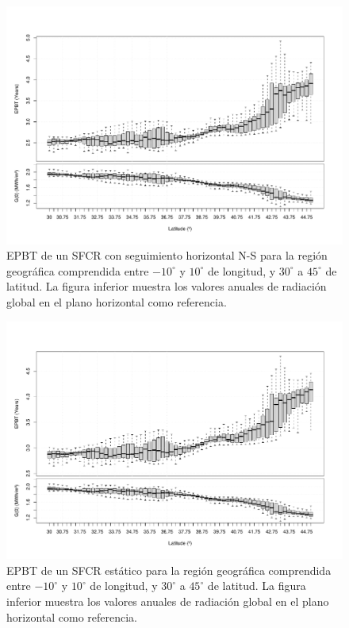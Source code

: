\begin{figure}[p]
\begin{centering}
\includegraphics[height=0.38\textheight]{../figs/BoxPlotEPBTEuropa_SODA002}
\par\end{centering}

\caption{\label{EPBTHorizBoxPlot}EPBT de un SFCR con seguimiento
  horizontal N-S para la región geográfica comprendida entre
  $-10^{\circ}$ y $10^{\circ}$ de longitud, y $30^{\circ}$ a
  $45^{\circ}$ de latitud.  La figura inferior muestra los valores
  anuales de radiación global en el plano horizontal como referencia.}
\end{figure}


\begin{figure}[p]
\begin{centering}
\includegraphics[height=0.38\textheight]{../figs/BoxPlotEPBTEuropa_SODA003}
\par\end{centering}

\caption{\label{EPBTEstBoxPlot}EPBT de un SFCR estático para la región
  geográfica comprendida entre $-10^{\circ}$ y $10^{\circ}$ de
  longitud, y $30^{\circ}$ a $45^{\circ}$ de latitud.  La figura
  inferior muestra los valores anuales de radiación global en el plano
  horizontal como referencia.}
\end{figure}



